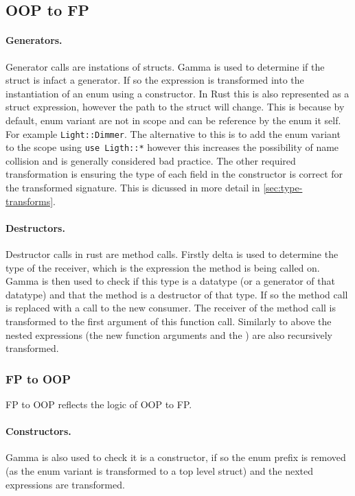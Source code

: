 \documentclass[ oneside,%
                    author={James Elgar},
                    degree={MEng},
                     title={Bidirectional transformer between functional and \\ object-oriented programming in Rust},
                  subtitle={}]{dissertation}
\newcommand{\rust}[1]{\texttt{#1}}
\begin{document}
\subsection{OOP to FP}

\paragraph{Generators. } Generator calls are instations of structs. Gamma is used to determine if the struct is infact a generator. If so the expression is transformed into the instantiation of an enum using a constructor. In Rust this is also represented as a struct expression, however the path to the struct will change. This is because by default, enum variant are not in scope and can be reference by the enum it self. For example \rust{Light::Dimmer}. The alternative to this is to add the enum variant to the scope using \rust{use Ligth::*} however this increases the possibility of name collision and is generally considered bad practice. The other required transformation is ensuring the type of each field in the constructor is correct for the transformed signature. This is dicussed in more detail in \autoref{sec:type-transforms}.

\paragraph{Destructors. } Destructor calls in rust are method calls. Firstly delta is used to determine the type of the receiver, which is the expression the method is being called on. Gamma is then used to check if this type is a datatype (or a generator of that datatype) and that the method is a destructor of that type. If so the method call is replaced with a call to the new consumer. The receiver of the method call is transformed to the first argument of this function call. Similarly to above the nested expressions (the new function arguments and the ) are also recursively transformed.

\subsubsection{FP to OOP}

FP to OOP reflects the logic of OOP to FP.

\paragraph{Constructors. }  Gamma is also used to check it is a constructor, if so the enum prefix is removed (as the enum variant is transformed to a top level struct) and the nexted expressions are transformed.
\end{document}

